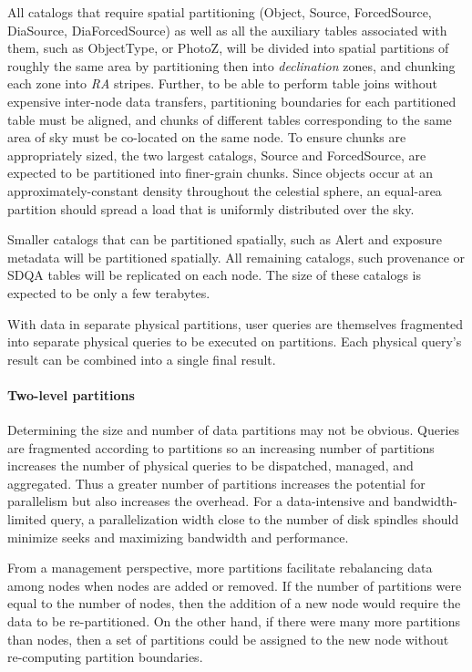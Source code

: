\documentclass[DM,lsstdraft,toc]{lsstdoc}
\begin{document}
All catalogs that require spatial partitioning (Object, Source,
ForcedSource, DiaSource, DiaForcedSource) as well as all the auxiliary
tables associated with them, such as ObjectType, or PhotoZ, will be
divided into spatial partitions of roughly the same area by partitioning
then into \emph{declination} zones, and chunking each zone into
\emph{RA} stripes. Further, to be able to perform table joins without
expensive inter-node data transfers, partitioning boundaries for each
partitioned table must be aligned, and chunks of different tables
corresponding to the same area of sky must be co-located on the same
node. To ensure chunks are appropriately sized, the two largest
catalogs, Source and ForcedSource, are expected to be partitioned into
finer-grain chunks. Since objects occur at an approximately-constant
density throughout the celestial sphere, an equal-area partition should
spread a load that is uniformly distributed over the sky.

Smaller catalogs that can be partitioned spatially, such as Alert and
exposure metadata will be partitioned spatially. All remaining catalogs,
such provenance or SDQA tables will be replicated on each node. The size
of these catalogs is expected to be only a few terabytes.

With data in separate physical partitions, user queries are themselves
fragmented into separate physical queries to be executed on partitions.
Each physical query's result can be combined into a single final result.

\paragraph{Two-level partitions}\label{two-level-partitions}

Determining the size and number of data partitions may not be obvious.
Queries are fragmented according to partitions so an increasing number
of partitions increases the number of physical queries to be dispatched,
managed, and aggregated. Thus a greater number of partitions increases
the potential for parallelism but also increases the overhead. For a
data-intensive and bandwidth-limited query, a parallelization width
close to the number of disk spindles should minimize seeks and
maximizing bandwidth and performance.

From a management perspective, more partitions facilitate rebalancing
data among nodes when nodes are added or removed. If the number of
partitions were equal to the number of nodes, then the addition of a new
node would require the data to be re-partitioned. On the other hand, if
there were many more partitions than nodes, then a set of partitions
could be assigned to the new node without re-computing partition
boundaries.
\end{document}
